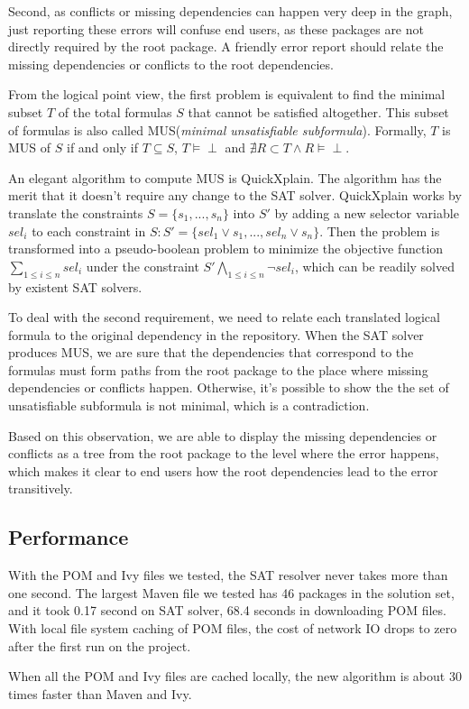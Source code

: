 Second, as conflicts or missing dependencies can happen very deep in the graph, just reporting these errors will confuse end users, as these packages are not directly required by the root package. A friendly error report should relate the missing dependencies or conflicts to the root dependencies.

From the logical point view, the first problem is equivalent to find the minimal subset $T$ of the total formulas $S$ that cannot be satisfied altogether. This subset of formulas is also called MUS(\emph{minimal unsatisfiable subformula}). Formally, $T$ is MUS of $S$ if and only if $T \subseteq S$, $T \vDash \perp$ and $\nexists R \subset T \wedge R \vDash \perp$.

An elegant algorithm to compute MUS is QuickXplain\cite{junker2004quickxplain}. The algorithm has the merit that it doesn't require any change to the SAT solver. QuickXplain works by translate the constraints $S = \{ s_1, ..., s_n\}$ into $S'$ by adding a new selector variable $sel_i$ to each constraint in $S: S' = \{ sel_1 \vee s_1, ..., sel_n \vee s_n\}$. Then the problem is transformed into a pseudo-boolean problem to minimize the objective function $\sum_{1 \leq i \leq n} sel_i$ under the constraint $S' \bigwedge_{1 \leq i \leq n} \neg sel_i$, which can be readily solved by existent SAT solvers.

To deal with the second requirement, we need to relate each translated logical formula to the original dependency in the repository. When the SAT solver produces MUS, we are sure that the dependencies that correspond to the formulas must form paths from the root package to the place where missing dependencies or conflicts happen. Otherwise, it's possible to show the the set of unsatisfiable subformula is not minimal, which is a contradiction.

Based on this observation, we are able to display the missing dependencies or conflicts as a tree from the root package to the level where the error happens, which makes it clear to end users how the root dependencies lead to the error transitively.

\subsection{Performance}

With the POM and Ivy files we tested, the SAT resolver never takes more than one second. The largest Maven file we tested has 46 packages in the solution set, and it took 0.17 second on SAT solver, 68.4 seconds in downloading POM files. With local file system caching of POM files, the cost of network IO drops to zero after the first run on the project.

When all the POM and Ivy files are cached locally, the new algorithm is about 30 times faster than Maven and Ivy.
